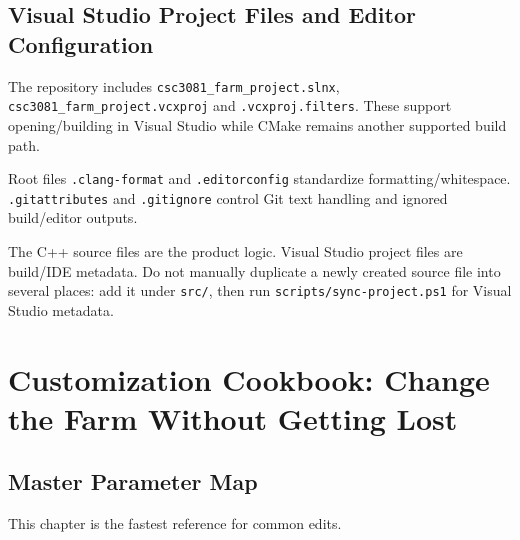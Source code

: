 \documentclass[11pt,a4paper,openany]{book}
\newcommand{\file}[1]{\nolinkurl{#1}}
\begin{document}
\chapter{Visual Studio Project Files and Editor Configuration}
The repository includes \file{csc3081\_farm\_project.slnx}, \file{csc3081\_farm\_project.vcxproj} and \file{.vcxproj.filters}. These support opening/building in Visual Studio while CMake remains another supported build path.

Root files \file{.clang-format} and \file{.editorconfig} standardize formatting/whitespace. \file{.gitattributes} and \file{.gitignore} control Git text handling and ignored build/editor outputs.

\begin{beginnerbox}
	The C++ source files are the product logic. Visual Studio project files are build/IDE metadata. Do not manually duplicate a newly created source file into several places: add it under \file{src/}, then run \file{scripts/sync-project.ps1} for Visual Studio metadata.
\end{beginnerbox}

\part{Customization Cookbook: Change the Farm Without Getting Lost}

\chapter{Master Parameter Map}
This chapter is the fastest reference for common edits.
\end{document}
